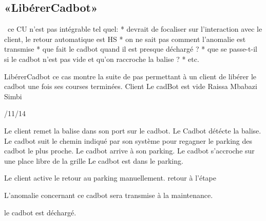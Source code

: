 \subsection{«LibérerCadbot»}
\TODO\ ce CU n'est pas intégrable tel quel: 
* devrait de focaliser sur l'interaction avec le client, le retour automatique est HS
* on ne sait pas comment l'anomalie est transmise
* que fait le cadbot quand il est presque déchargé ?
* que se passe-t-il si le cadbot n'est pas vide et qu'on raccroche la balise ?
* etc.

\startCU
\nom LibérerCadbot
\but  ce cas montre la suite de pas permettant à un client de libérer le cadbot une fois ses courses terminées.
\acteur Client
\precondition Le cadBot est vide
\auteur Raissa Mbabazi Simbi
\date 7/11/14

\nominal %
\startnominal
\etape[SA1] Le client remet la balise dans son port sur le cadbot. 
\etape Le Cadbot détécte la balise.
\etape[RETOUR] Le cadbot suit le chemin indiqué par son système pour regagner le parking des cadbot le plus proche.
\etape Le cadbot arrive à son parking.
\etape Le cadbot s'accroche sur une place libre de la grille 
\stopnominal
\postcondition Le cadbot est dans le parking.

\alternatifs
\startalternatif[SA1] %
  \etape Le client active le retour au parking manuellement.
	\etape retour à l'étape \in[RETOUR]

\stopcondition
\postcondition L'anomalie concernant ce cadbot sera transmise à la maintenance.
\stopalternatif



\exception
le cadbot est déchargé.
\stopCU
